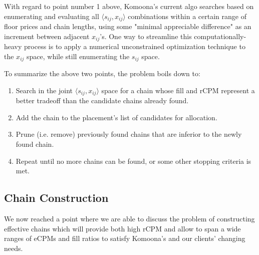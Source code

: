 \documentclass{article}
\begin{document}
\begin{large}
With regard to point number 1 above, Komoona's current algo searches based on enumerating and evaluating all $ \big \langle s_{ij},x_{ij} \big \rangle $ combinations within a certain range of floor prices and chain lengths, using some "minimal appreciable difference" as an increment between adjacent $x_{ij}$'s.  One way to streamline this computationally-heavy process is to apply a numerical unconstrained optimization technique to the $x_{ij}$ space, while still enumerating the $s_{ij}$ space. 

 To summarize the above two points, the problem boils down to: 
\begin{enumerate}
\item Search in the joint $ \big \langle s_{ij},x_{ij} \big \rangle $ space for a chain whose fill and rCPM represent a better tradeoff than the candidate chains already found.
\item Add the chain to the placement's list of candidates for allocation.
\item Prune (i.e. remove) previously found chains that are inferior to the newly found chain.
\item Repeat until no more chains can be found, or some other stopping criteria is met.
\end{enumerate}

\subsection{Chain Construction}
We now reached a point where we are able to discuss the problem of constructing effective chains which will provide both high rCPM and allow to span a wide ranges of eCPMs and fill ratios to satisfy Komoona's and our clients' changing needs.


\end{large}
\end{document}
